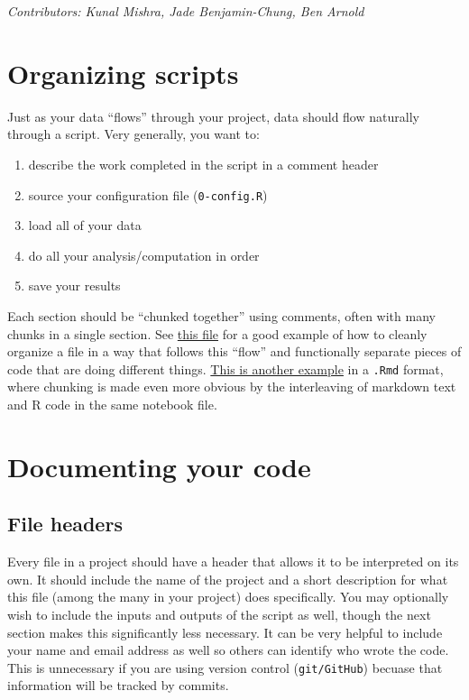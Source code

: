 \documentclass[]{book}
\providecommand{\tightlist}{%
  \setlength{\itemsep}{0pt}\setlength{\parskip}{0pt}}
\begin{document}
\emph{Contributors: Kunal Mishra, Jade Benjamin-Chung, Ben Arnold}

\hypertarget{organizing-scripts}{%
\section{Organizing scripts}\label{organizing-scripts}}

Just as your data ``flows'' through your project, data should flow naturally through a script. Very generally, you want to:

\begin{enumerate}
\def\labelenumi{\arabic{enumi}.}
\tightlist
\item
  describe the work completed in the script in a comment header
\item
  source your configuration file (\texttt{0-config.R})
\item
  load all of your data
\item
  do all your analysis/computation in order
\item
  save your results
\end{enumerate}

Each section should be ``chunked together'' using comments, often with many chunks in a single section. See \href{https://github.com/kmishra9/Flu-Absenteeism/blob/master/Master's\%20Thesis\%20-\%20Spatial\%20Epidemiology\%20of\%20Influenza/2a\%20-\%20Statistical-Inputs.R}{this file} for a good example of how to cleanly organize a file in a way that follows this ``flow'' and functionally separate pieces of code that are doing different things. \href{https://github.com/ben-arnold/enterics-seroepi/blob/master/R/Fig1-haiti-ab-distributions.Rmd}{This is another example} in a \texttt{.Rmd} format, where chunking is made even more obvious by the interleaving of markdown text and R code in the same notebook file.

\hypertarget{documenting-your-code}{%
\section{Documenting your code}\label{documenting-your-code}}

\hypertarget{file-headers}{%
\subsection{File headers}\label{file-headers}}

Every file in a project should have a header that allows it to be interpreted on its own. It should include the name of the project and a short description for what this file (among the many in your project) does specifically. You may optionally wish to include the inputs and outputs of the script as well, though the next section makes this significantly less necessary. It can be very helpful to include your name and email address as well so others can identify who wrote the code. This is unnecessary if you are using version control (\texttt{git/GitHub}) becuase that information will be tracked by commits.
\end{document}
